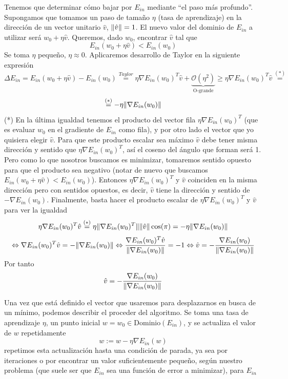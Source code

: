 \documentclass[11pt,a4paper]{article}
\DeclarePairedDelimiter{\norm}{\lVert}{\rVert}
\theoremstyle{definition}
\begin{document}
	Tenemos que determinar cómo bajar por $E_{in}$ mediante ``el paso más profundo''. Supongamos que tomamos un paso de tamaño $\eta$ (tasa de aprendizaje) en la dirección de un vector unitario $\hat v$, $\norm{\hat v}=1$. El nuevo valor del dominio de $E_{in}$ a utilizar será $w_0+\eta \hat v$. Queremos, dado $w_0$, encontrar $\hat v$ tal que $$E_{in}(w_0+\eta \hat v)<E_{in}(w_0)$$
Se toma $\eta$ pequeño, $\eta \approx 0$. Aplicaremos desarrollo de Taylor en la siguiente expresión
	$$\Delta E_{in}=E_{in}(w_0+\eta \hat v) - E_{in}(w_0)\stackrel{Taylor}{=} \eta \nabla E_{in}(w_0)^T\hat v + \underbrace{\mathcal{O}(\eta ^2)}_{\text{O-grande}} \geq  \eta \nabla E_{in}(w_0)^T\hat v  \stackrel{(*)}{=}$$ $$ \stackrel{(*)}{=}-\eta \norm{\nabla E_{in}(w_0)}$$
	(*) En la última igualdad tenemos el producto del vector fila $\eta \nabla E_{in}(w_0)^T$ (que es evaluar $w_0$ en el gradiente de $E_{in}$ como fila), y por otro lado el vector que yo quisiera elegir $\hat v$. Para que este producto escalar sea máximo $\hat v$ debe tener misma dirección y sentido que $\eta \nabla E_{in}(w_0)^T$, así el coseno del ángulo que forman será 1. Pero como lo que nosotros buscamos es minimizar, tomaremos sentido opuesto para que el producto sea negativo (notar de nuevo que buscamos $E_{in}(w_0+\eta \hat v)<E_{in}(w_0)$). Entonces $\eta \nabla E_{in}(w_0)^T$ y $\hat v$ coinciden en la misma dirección pero con sentidos opuestos, es decir, $\hat v$ tiene la dirección y sentido de $-\nabla E_{in}(w_0)$. Finalmente, basta hacer el producto escalar de $\eta \nabla E_{in}(w_0)^T$ y $\hat v$  para ver la igualdad $$\eta \nabla E_{in}(w_0)^T \hat v\stackrel{(*)}{=} \eta \norm{\nabla E_{in}(w_0)^T} \norm{\hat v} \cos(\pi)=-\eta \norm{\nabla E_{in}(w_0)} $$
	$$\Leftrightarrow \nabla E_{in}(w_0)^T \hat v= -\norm{\nabla E_{in}(w_0)} \Leftrightarrow \frac{\nabla E_{in}(w_0)^T \hat v}{\norm{\nabla E_{in}(w_0)}}= -1 \Leftrightarrow \hat v=-\frac{\nabla E_{in}(w_0)}{\norm{\nabla E_{in}(w_0)}}$$
	Por tanto
	$$\hat v=-\frac{\nabla E_{in}(w_0)}{\norm{\nabla E_{in}(w_0)}}$$
	
	Una vez que está definido el vector que usaremos para desplazarnos en busca de un mínimo, podemos describir el proceder del algoritmo. Se toma una tasa de aprendizaje $\eta$, un punto inicial $w=w_0\in \text{Dominio}(E_{in})$, y se actualiza el valor de $w$ repetidamente
	$$w:=w-\eta \nabla E_{in}(w)$$
	repetimos esta actualización hasta una condición de parada, ya sea por iteraciones o por encontrar un valor suficientemente pequeño, según nuestro problema (que suele ser que $E_{in}$ sea una función de error a minimizar), para $E_{in}$\\
	
\end{document}
